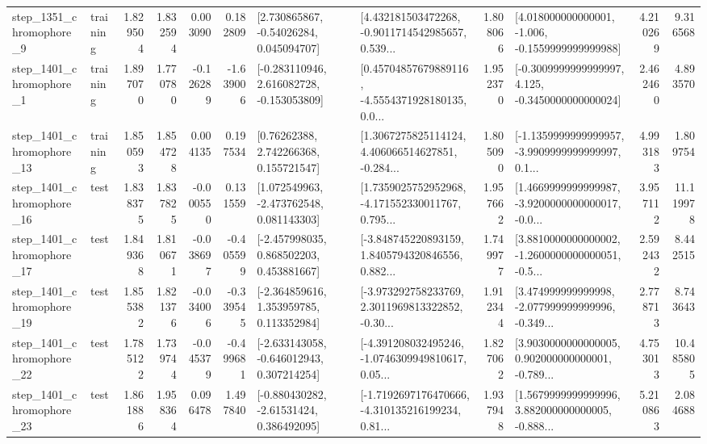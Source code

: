 \begin{tabular}{llrrrrllrlrr}
  step\_1351\_chromophore\_9 &  training &      1.829504 &    1.832594 &      0.003090 &  0.182809 &     [2.730865867, -0.54026284, 0.045094707] &  [4.432181503472268, -0.9011714542985657, 0.539... &       1.808066 &   [4.018000000000001, -1.006, -0.1559999999999988] &            4.210269 &          9.316568 \\
  step\_1401\_chromophore\_1 &  training &      1.897070 &    1.770780 &     -0.126289 & -1.639006 &   [-0.283110946, 2.616082728, -0.153053809] &  [0.45704857679889116, -4.5554371928180135, 0.0... &       1.952370 &  [-0.3009999999999997, 4.125, -0.3450000000000024] &            2.462460 &          4.893570 \\
 step\_1401\_chromophore\_13 &  training &      1.850593 &    1.854728 &      0.004135 &  0.197534 &      [0.76262388, 2.742266368, 0.155721547] &  [1.3067275825114124, 4.406066514627851, -0.284... &       1.805090 &  [-1.1359999999999957, -3.9909999999999997, 0.1... &            4.993183 &          1.809754 \\
 step\_1401\_chromophore\_16 &      test &      1.838375 &    1.837825 &     -0.000550 &  0.131559 &    [1.072549963, -2.473762548, 0.081143303] &  [1.7359025752952968, -4.171552330011767, 0.795... &       1.957662 &  [1.4669999999999987, -3.9200000000000017, -0.0... &            3.957112 &         11.119978 \\
 step\_1401\_chromophore\_17 &      test &      1.849368 &    1.810671 &     -0.038697 & -0.405599 &    [-2.457998035, 0.868502203, 0.453881667] &  [-3.848745220893159, 1.8405794320846556, 0.882... &       1.749977 &  [3.8810000000000002, -1.2600000000000051, -0.5... &            2.592432 &          8.442515 \\
 step\_1401\_chromophore\_19 &      test &      1.855382 &    1.821376 &     -0.034006 & -0.339545 &    [-2.364859616, 1.353959785, 0.113352984] &  [-3.973292758233769, 2.3011969813322852, -0.30... &       1.912344 &  [3.474999999999998, -2.077999999999996, -0.349... &            2.778713 &          8.743643 \\
 step\_1401\_chromophore\_22 &      test &      1.785122 &    1.739744 &     -0.045379 & -0.499681 &   [-2.633143058, -0.646012943, 0.307214254] &  [-4.391208032495246, -1.0746309949810617, 0.05... &       1.827062 &  [3.9030000000000005, 0.902000000000001, -0.789... &            4.753013 &         10.485805 \\
 step\_1401\_chromophore\_23 &      test &      1.861886 &    1.958364 &      0.096478 &  1.497840 &    [-0.880430282, -2.61531424, 0.386492095] &  [-1.7192697176470666, -4.310135216199234, 0.81... &       1.937948 &  [1.5679999999999996, 3.882000000000005, -0.888... &            5.210863 &          2.084688 \\

\end{tabular}
